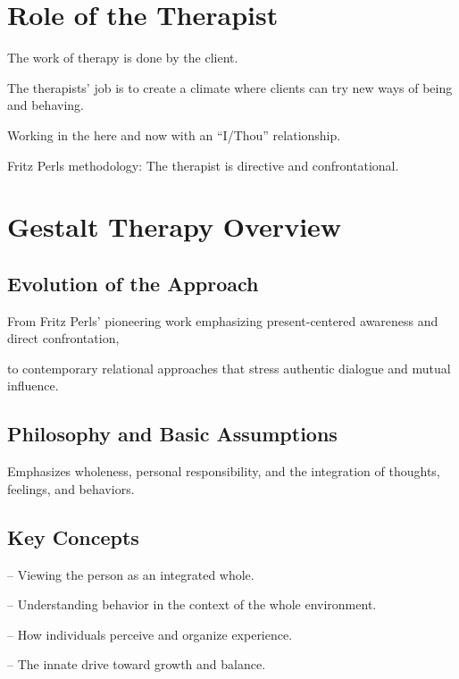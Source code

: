 \section{Role of the Therapist}

\begin{coloredlist}
    \item The work of therapy is done by the client.
    \item The therapists' job is to create a climate where clients can try new ways of being and behaving.
    \item Working in the here and now with an ``I/Thou'' relationship.
    \item Fritz Perls methodology: The therapist is directive and confrontational.
\end{coloredlist}

\section{Gestalt Therapy Overview}
\subsection{Evolution of the Approach}
\begin{coloredlist}
    \item From Fritz Perls’ pioneering work emphasizing present-centered awareness and direct confrontation,
    \item to contemporary relational approaches that stress authentic dialogue and mutual influence.
\end{coloredlist}

\subsection{Philosophy and Basic Assumptions}
\begin{coloredlist}
    \item Emphasizes wholeness, personal responsibility, and the integration of thoughts, feelings, and behaviors.
\end{coloredlist}

\subsection{Key Concepts}
\begin{coloredlist}
    \item {} – Viewing the person as an integrated whole.
    \item {} – Understanding behavior in the context of the whole environment.
    \item {} – How individuals perceive and organize experience.
    \item {} – The innate drive toward growth and balance.
\end{coloredlist}

